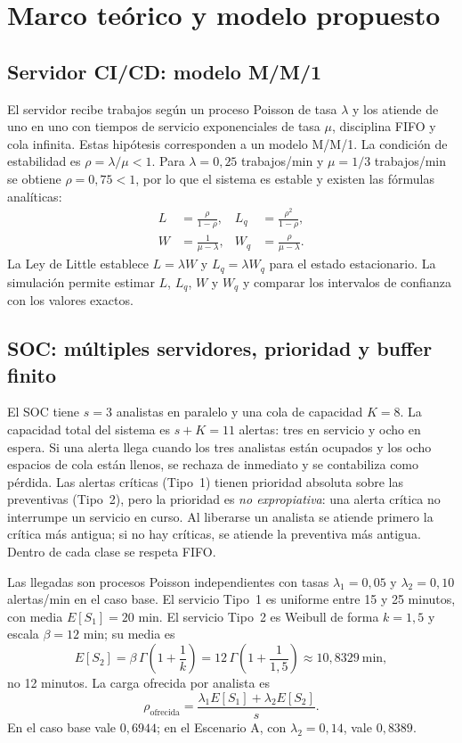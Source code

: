 \section{Marco teórico y modelo propuesto}

\subsection{Servidor CI/CD: modelo M/M/1}

El servidor recibe trabajos según un proceso Poisson de tasa $\lambda$ y los
atiende de uno en uno con tiempos de servicio exponenciales de tasa $\mu$,
disciplina FIFO y cola infinita. Estas hipótesis corresponden a un modelo
M/M/1. La condición de estabilidad es $\rho=\lambda/\mu<1$. Para
$\lambda=0{,}25$ trabajos/min y $\mu=1/3$ trabajos/min se obtiene
$\rho=0{,}75<1$, por lo que el sistema es estable y existen las fórmulas
analíticas:
\begin{align}
L   &= \frac{\rho}{1-\rho}, &
L_q &= \frac{\rho^2}{1-\rho}, \\
W   &= \frac{1}{\mu-\lambda}, &
W_q &= \frac{\rho}{\mu-\lambda}.
\end{align}
La Ley de Little establece $L=\lambda W$ y $L_q=\lambda W_q$ para el estado
estacionario. La simulación permite estimar $L$, $L_q$, $W$ y $W_q$ y comparar
los intervalos de confianza con los valores exactos.

\subsection{SOC: múltiples servidores, prioridad y buffer finito}

El SOC tiene $s=3$ analistas en paralelo y una cola de capacidad $K=8$. La
capacidad total del sistema es $s+K=11$ alertas: tres en servicio y ocho en
espera. Si una alerta llega cuando los tres analistas están ocupados y los ocho
espacios de cola están llenos, se rechaza de inmediato y se contabiliza como
pérdida. Las alertas críticas (Tipo~1) tienen prioridad absoluta sobre las
preventivas (Tipo~2), pero la prioridad es \emph{no expropiativa}: una alerta
crítica no interrumpe un servicio en curso. Al liberarse un analista se atiende
primero la crítica más antigua; si no hay críticas, se atiende la preventiva
más antigua. Dentro de cada clase se respeta FIFO.

Las llegadas son procesos Poisson independientes con tasas $\lambda_1=0{,}05$
y $\lambda_2=0{,}10$ alertas/min en el caso base. El servicio Tipo~1 es
uniforme entre 15 y 25 minutos, con media $E[S_1]=20$ min. El servicio Tipo~2
es Weibull de forma $k=1{,}5$ y escala $\beta=12$ min; su media es
\begin{equation}
E[S_2]=\beta\,\Gamma\!\left(1+\frac{1}{k}\right)
      =12\,\Gamma\!\left(1+\frac{1}{1{,}5}\right)\approx 10{,}8329\ \text{min},
\end{equation}
no 12 minutos. La carga ofrecida por analista es
\begin{equation}
\rho_{\text{ofrecida}}=\frac{\lambda_1 E[S_1]+\lambda_2 E[S_2]}{s}.
\end{equation}
En el caso base vale $0{,}6944$; en el Escenario A, con
$\lambda_2=0{,}14$, vale $0{,}8389$.

